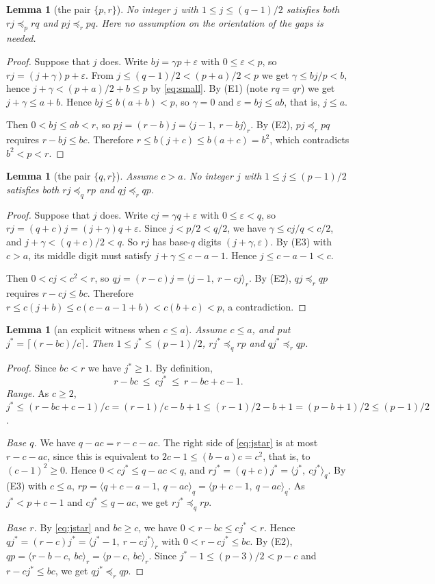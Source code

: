 \documentclass[11pt,a4paper]{article}
\newtheorem{lemma}[theorem]{Lemma}
\theoremstyle{definition}
\newcommand{\dom}[1]{\preceq_{#1}}
\newcommand{\dig}[1]{\langle #1\rangle}
\begin{document}
\begin{lemma}[the pair $\{p,r\}$]\label{lem:pr}
No integer $j$ with $1\le j\le (q-1)/2$ satisfies both $rj\dom p rq$ and $pj\dom r pq$. Here no assumption on the orientation of the gaps is needed.
\end{lemma}
\begin{proof}
Suppose that $j$ does. Write $bj=\gamma p+\varepsilon$ with $0\le\varepsilon<p$, so $rj=(j+\gamma)p+\varepsilon$. From $j\le(q-1)/2<(p+a)/2<p$ we get $\gamma\le bj/p<b$, hence $j+\gamma<(p+a)/2+b\le p$ by \eqref{eq:small}. By (E1) (note $rq=qr$) we get $j+\gamma\le a+b$. Hence $bj\le b(a+b)<p$, so $\gamma=0$ and $\varepsilon=bj\le ab$, that is, $j\le a$.

Then $0<bj\le ab<r$, so $pj=(r-b)j=\dig{j-1,\ r-bj}_r$. By (E2), $pj\dom r pq$ requires $r-bj\le bc$. Therefore $r\le b(j+c)\le b(a+c)=b^2$, which contradicts $b^2<p<r$.
\end{proof}

\begin{lemma}[the pair $\{q,r\}$]\label{lem:qr}
Assume $c>a$. No integer $j$ with $1\le j\le (p-1)/2$ satisfies both $rj\dom q rp$ and $qj\dom r qp$.
\end{lemma}
\begin{proof}
Suppose that $j$ does. Write $cj=\gamma q+\varepsilon$ with $0\le\varepsilon<q$, so $rj=(q+c)j=(j+\gamma)q+\varepsilon$. Since $j<p/2<q/2$, we have $\gamma\le cj/q<c/2$, and $j+\gamma<(q+c)/2<q$. So $rj$ has base-$q$ digits $(j+\gamma,\varepsilon)$. By (E3) with $c>a$, its middle digit must satisfy $j+\gamma\le c-a-1$. Hence $j\le c-a-1<c$.

Then $0<cj<c^2<r$, so $qj=(r-c)j=\dig{j-1,\ r-cj}_r$. By (E2), $qj\dom r qp$ requires $r-cj\le bc$. Therefore $r\le c(j+b)\le c(c-a-1+b)<c(b+c)<p$, a contradiction.
\end{proof}

\begin{lemma}[an explicit witness when $c\le a$]\label{lem:witness}
Assume $c\le a$, and put $j^*=\lceil (r-bc)/c\rceil$. Then $1\le j^*\le(p-1)/2$, $rj^*\dom q rp$ and $qj^*\dom r qp$.
\end{lemma}
\begin{proof}
Since $bc<r$ we have $j^*\ge1$. By definition,
\begin{equation}\label{eq:jstar}
r-bc\ \le\ cj^*\ \le\ r-bc+c-1 .
\end{equation}
\emph{Range.} As $c\ge2$, $j^*\le (r-bc+c-1)/c=(r-1)/c-b+1\le (r-1)/2-b+1=(p-b+1)/2\le(p-1)/2$.

\emph{Base $q$.} We have $q-ac=r-c-ac$. The right side of \eqref{eq:jstar} is at most $r-c-ac$, since this is equivalent to $2c-1\le (b-a)c=c^2$, that is, to $(c-1)^2\ge0$. Hence $0<cj^*\le q-ac<q$, and $rj^*=(q+c)j^*=\dig{j^*,\ cj^*}_q$. By (E3) with $c\le a$, $rp=\dig{q+c-a-1,\ q-ac}_q=\dig{p+c-1,\ q-ac}_q$. As $j^*<p+c-1$ and $cj^*\le q-ac$, we get $rj^*\dom q rp$.

\emph{Base $r$.} By \eqref{eq:jstar} and $bc\ge c$, we have $0<r-bc\le cj^*<r$. Hence $qj^*=(r-c)j^*=\dig{j^*-1,\ r-cj^*}_r$ with $0<r-cj^*\le bc$. By (E2), $qp=\dig{r-b-c,\ bc}_r=\dig{p-c,\ bc}_r$. Since $j^*-1\le(p-3)/2<p-c$ and $r-cj^*\le bc$, we get $qj^*\dom r qp$.
\end{proof}
\end{document}
